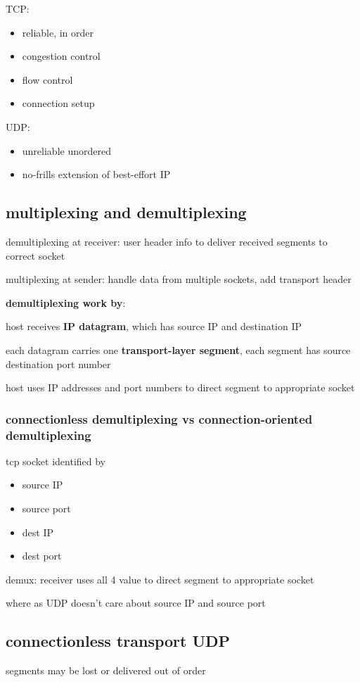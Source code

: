 \documentclass[10pt]{article}
\theoremstyle{break}
\begin{document}
TCP:
\begin{itemize}
    \item reliable, in order 
    \item congestion control 
    \item flow control 
    \item connection setup 
\end{itemize}

UDP:
\begin{itemize}
    \item unreliable unordered 
    \item no-frills extension of best-effort IP 
\end{itemize}


\subsection{multiplexing and demultiplexing}
demultiplexing at receiver: user header info to deliver received segments to correct socket 

multiplexing at sender: handle data from multiple sockets, add transport header 

\textbf{demultiplexing work by}:

host receives \textbf{ IP datagram}, which has source IP and destination IP 

each datagram carries one \textbf{ transport-layer segment}, each segment has source destination port number

host uses IP addresses and port numbers to direct segment to appropriate socket

\subsubsection{connectionless demultiplexing vs connection-oriented demultiplexing}
tcp socket identified by 
\begin{itemize}
    \item source IP 
    \item source port 
    \item dest IP 
    \item dest port
\end{itemize}

demux: receiver uses all 4 value to direct segment to appropriate socket 

where as UDP doesn't care about source IP and source port


\subsection{connectionless transport UDP}
segments may be lost or delivered out of order  
\end{document}
